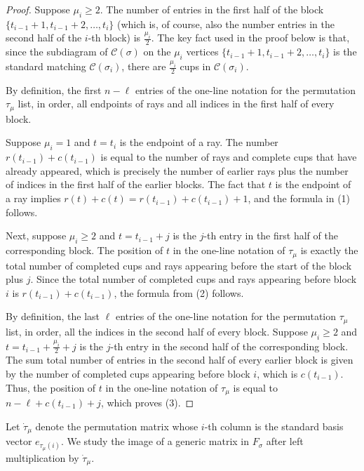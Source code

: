 \documentclass[11pt]{amsart}
\theoremstyle{remark}
\theoremstyle{remark}
\theoremstyle{definition}
\theoremstyle{definition}
\theoremstyle{definition}
\numberwithin{equation}{section}
\newcommand{\gs}{\sigma}
\newcommand{\cc}{\mathcal{C}}
\newcommand{\cupsigma}{\cc(\gs)}
\newcommand{\parsum}{t}
\begin{document}
\begin{proof} Suppose $\mu_i\geq 2$. The number of entries in the first half of the block $\{\parsum_{i-1}+1, \parsum_{i-1}+2, \ldots, \parsum_i\}$ (which is, of course, also the number entries in the second half of the $i$-th block) is $\frac{\mu_i}{2}$. The key fact used in the proof below is that, since the subdiagram of $\cupsigma$ on the $\mu_i$ vertices $\{\parsum_{i-1}+1, \parsum_{i-1}+2, \ldots, \parsum_i\}$ is the standard matching $\cc(\sigma_i)$, there are $\frac{\mu_i}{2}$ cups in $\cc(\sigma_i)$. 

By definition, the first $n-\ell$ entries of the one-line notation for the permutation $\tau_\mu$ list, in order, all endpoints of rays and all indices in the first half of every block. 

Suppose $\mu_i =1$ and $t=\parsum_i$ is the endpoint of a ray. The number $r(\parsum_{i-1})+c(\parsum_{i-1})$ is equal to the number of rays and complete cups that have already appeared, which is precisely the number of earlier rays plus the number of indices in the first half of the earlier blocks. The fact that $t$ is the endpoint of a ray implies $r(t)+c(t) = r(\parsum_{i-1})+c(\parsum_{i-1}) +1$, and the formula in (1) follows.  

Next, suppose $\mu_i\geq 2$ and $t= \parsum_{i-1}+j$ is the $j$-th entry in the first half of the corresponding block. The position of $t$ in the one-line notation of $\tau_\mu$ is exactly the total number of completed cups and rays appearing before the start of the block plus $j$. Since the total number of completed cups and rays appearing before block $i$ is $r(\parsum_{i-1})+c(\parsum_{i-1})$, the formula from (2) follows. 

By definition, the last $\ell$ entries of the one-line notation for the permutation $\tau_\mu$ list, in order, all the indices in the second half of every block.
Suppose $\mu_i\geq 2$ and $t=\parsum_{i-1}+\frac{\mu_i}{2}+j$ is the $j$-th entry in the second half of the corresponding block. The sum total number of entries in the second half of every earlier block is given by the number of completed cups appearing before block $i$, which is $c(\parsum_{i-1})$. Thus, the position of $t$ in the one-line notation of $\tau_\mu$ is equal to $n-\ell + c(\parsum_{i-1})+j$, which proves (3).
\end{proof}

Let $\dot \tau_\mu$ denote the permutation matrix whose $i$-th column is the standard basis vector $e_{\tau_{\mu}(i)}$. 
We study the image of a generic matrix in $F_\gs$ after left multiplication by $\dot\tau_\mu$. 
\end{document}
